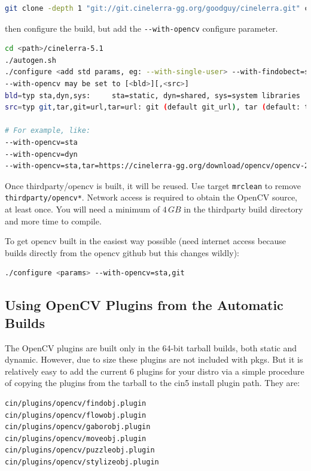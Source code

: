 {\begin{lstlisting}[language=Bash,numbers=none]
git clone -depth 1 "git://git.cinelerra-gg.org/goodguy/cinelerra.git" cinelerra5
\end{lstlisting}

then configure the build, but add the \texttt{-{}-with-opencv} configure parameter.

\begin{lstlisting}[language=Bash,numbers=none]
cd <path>/cinelerra-5.1
./autogen.sh
./configure <add std params, eg: --with-single-user> --with-findobect=sta
--with-opencv may be set to [<bld>][,<src>]
bld=typ sta,dyn,sys:	 sta=static, dyn=shared, sys=system libraries
src=typ git,tar,git=url,tar=url: git (default git_url), tar (default: tar_url)

# For example, like:
--with-opencv=sta
--with-opencv=dyn
--with-opencv=sta,tar=https://cinelerra-gg.org/download/opencv/opencv-20180401.tgz
\end{lstlisting}

Once thirdparty/opencv is built, it will be reused. Use target \texttt{mrclean} to remove \texttt{thirdparty/opencv*}.
Network access is required to obtain the OpenCV source, at least once. You will need a minimum of 
$4\, GB$ in the thirdparty build directory and more time to compile.

To get opencv built in the easiest way possible (need internet access because builds directly from the opencv github but this changes wildly):

\begin{lstlisting}[language=Bash,numbers=none]
./configure <params> --with-opencv=sta,git
\end{lstlisting}

\subsection{Using OpenCV Plugins from the Automatic Builds}%
\label{sub:using_opencv_automatic_builds}

The OpenCV plugins are built only in the 64-bit tarball builds, both static and dynamic. However, due to size these plugins are not included with pkgs. But it is relatively easy to add the current 6 plugins for your distro via a simple procedure of copying the plugins from the tarball to the cin5 install plugin path. They are: 

\begin{lstlisting}[language=Bash,numbers=none]
cin/plugins/opencv/findobj.plugin 
cin/plugins/opencv/flowobj.plugin
cin/plugins/opencv/gaborobj.plugin
cin/plugins/opencv/moveobj.plugin
cin/plugins/opencv/puzzleobj.plugin
cin/plugins/opencv/stylizeobj.plugin
\end{lstlisting}

}
